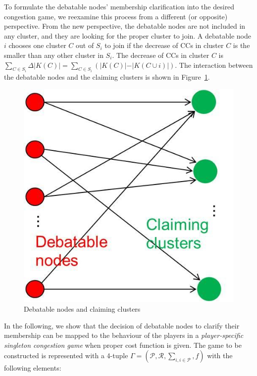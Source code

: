 \documentclass[10pt,journal,compsoc]{IEEEtran}
\theoremstyle{mytheoremstyle}
\theoremstyle{mytheoremstyle}
\theoremstyle{mytheoremstyle}
\begin{document}
To formulate the debatable nodes' membership clarification into the desired congestion game, we reexamine this process from a different (or opposite) perspective. 
From the new perspective, the debatable nodes are not included in any cluster, and they are looking for the proper cluster to join.
A debatable node $i$ chooses one cluster $C$ out of $S_i$ to join if the decrease of CCs in cluster $C$ is the smaller than any other cluster in $S_i$.
The decrease of CCs in cluster $C$ is $\sum_{C\in S_i}\Delta\vert K(C) \vert=\sum_{C\in S_i}({\vert K(C) \vert-\vert K(C\cup i) \vert})$.
The interaction between the debatable nodes and the claiming clusters is shown in Figure~\ref{debatable_nodes_claiming_cluster}.
\begin{figure}[ht!]
  \centering
  \includegraphics[width=0.25\linewidth]{singletongame_png.png}
  \caption{Debatable nodes and claiming clusters}
  \label{debatable_nodes_claiming_cluster}
\end{figure}




In the following, we show that the decision of debatable nodes to clarify their membership can be mapped to the behaviour of the players in a \textit{player-specific singleton congestion game} when proper cost function is given.
The game to be constructed is represented with a 4-tuple $\Gamma=(\mathcal{P},\mathcal{R},\sum_{i, i \in \mathcal{P}}, f)$ with the following elements:
\end{document}
